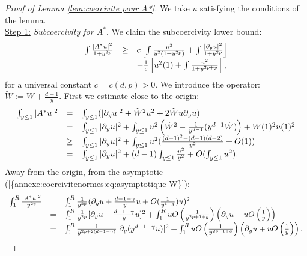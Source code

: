 \documentclass[11pt,a4paper,reqno]{amsart}
\theoremstyle{remark}
\numberwithin{equation}{section}
\begin{document}
\begin{appendix}
\begin{proof}[Proof of Lemma \ref{lem:coercivite pour A*}]
We take $u$ satisfying the conditions of the lemma.\\

\underline{Step 1:} \emph{Subcoercivity for $A^*$}. We claim the subcoercivity lower bound:
\begin{equation}\label{annexe:eq:estimation de sous coercivite A*}
\begin{array}{r c l}
\int \frac{|A^*u|^2}{1+y^{2p}}&\geq& c\left[ \int \frac{u^2}{y^2(1+y^{2p})}+\int \frac{|\partial_y u|^2}{1+y^{2p}}  \right] \\
&& -\frac{1}{c}\left[ u^2(1) +\int \frac{u^2}{1+y^{2p+g}}\right] ,
\end{array}
\end{equation}
for a universal constant $c=c(d,p)>0$. We introduce the operator: $\tilde{W}:=W+\frac{d-1}{y}$. First we estimate close to the origin:
\begin{equation} \label{annexe:coerciviteA*:eq: pres}
\begin{array}{r c l}
\int_{y\leq 1}|A^*u|^2 &=& \int_{y\leq 1} (|\partial_y u|^2+\tilde{W}^2u^2+2\tilde{W}u\partial_y u) \\
&=& \int_{y\leq 1} |\partial_y u|^2 +\int_{y\leq 1}u^2\left(\tilde{W}^2-\frac{1}{y^{d-1}}(y^{d-1}\tilde{W})\right)+W(1)^2u(1)^2 \\
&\geq & \int_{y\leq 1} |\partial_y u|^2 +\int_{y\leq 1}u^2(\frac{(d-1)^2-(d-1)(d-2)}{y^2}+O(1))\\
&=& \int_{y\leq 1} |\partial_y u|^2 +(d-1)\int_{y\leq 1}\frac{u^2}{y^2}+O(\int_{y\leq 1} u^2) .
\end{array}
\end{equation}
Away from the origin, from the asymptotic {{\rm (\ref{{annexe:coercivitenormes:eq:asymptotique W}})}}:
\begin{equation} \label{annexe:coerciviteA*:eq:loin intermediaire}
\begin{array}{r c l}
\int_1^R \frac{|A^*u|^2}{y^{2p}}&=& \int_1^R \frac{1}{y^{2p}}(\partial_y u+\frac{d-1-\gamma}{y}u+O(\frac{1}{y^{1+g}})u)^2 \\
&=& \int_1^R \frac{1}{y^{2p}}[\partial_y u+\frac{d-1-\gamma}{y}u]^2  + \int_1^R uO\left( \frac{1}{y^{2p+1+g}} \right)\left( \partial_y u +uO\left(\frac{1}{y} \right) \right)\\
&=& \int_1^R \frac{1}{y^{2p+2(d-1-\gamma)}}|\partial_y(y^{d-1-\gamma}u)|^2  + \int_1^R uO\left( \frac{1}{y^{2p+1+g}} \right)\left( \partial_y u +uO\left(\frac{1}{y} \right) \right) .

\end{array}
\end{equation}
\end{proof}
\end{appendix}
\end{document}
